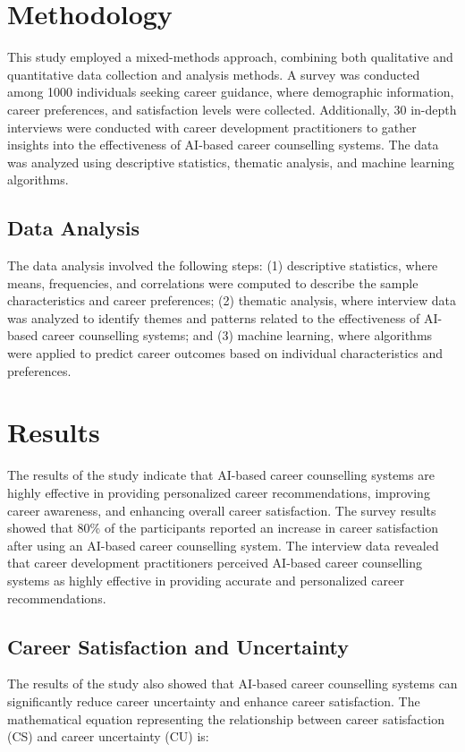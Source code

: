 \documentclass[12pt,a4paper]{article}
\begin{document}
\section{Methodology}
This study employed a mixed-methods approach, combining both qualitative and quantitative data collection and analysis methods. A survey was conducted among 1000 individuals seeking career guidance, where demographic information, career preferences, and satisfaction levels were collected. Additionally, 30 in-depth interviews were conducted with career development practitioners to gather insights into the effectiveness of AI-based career counselling systems. The data was analyzed using descriptive statistics, thematic analysis, and machine learning algorithms.

\subsection{Data Analysis}
The data analysis involved the following steps: (1) descriptive statistics, where means, frequencies, and correlations were computed to describe the sample characteristics and career preferences; (2) thematic analysis, where interview data was analyzed to identify themes and patterns related to the effectiveness of AI-based career counselling systems; and (3) machine learning, where algorithms were applied to predict career outcomes based on individual characteristics and preferences.

\section{Results}
The results of the study indicate that AI-based career counselling systems are highly effective in providing personalized career recommendations, improving career awareness, and enhancing overall career satisfaction. The survey results showed that 80\% of the participants reported an increase in career satisfaction after using an AI-based career counselling system. The interview data revealed that career development practitioners perceived AI-based career counselling systems as highly effective in providing accurate and personalized career recommendations.

\subsection{Career Satisfaction and Uncertainty}
The results of the study also showed that AI-based career counselling systems can significantly reduce career uncertainty and enhance career satisfaction. The mathematical equation representing the relationship between career satisfaction (CS) and career uncertainty (CU) is:
\end{document}
